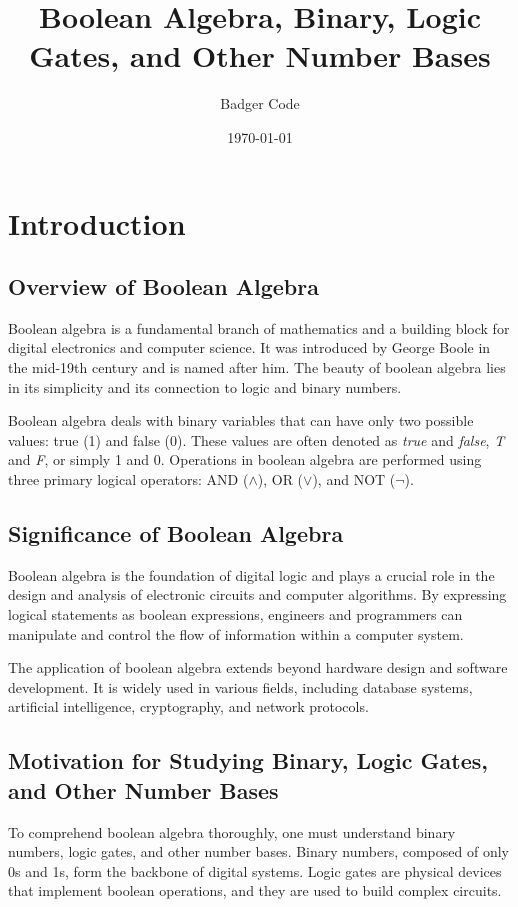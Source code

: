 \documentclass{article}
\title{Boolean Algebra, Binary, Logic Gates, and Other Number Bases}
\author{Badger Code}
\date{\today}
\begin{document}
\maketitle

\section{Introduction}

\subsection{Overview of Boolean Algebra}

Boolean algebra is a fundamental branch of mathematics and a building block for digital electronics and computer science. It was introduced by George Boole in the mid-19th century and is named after him. The beauty of boolean algebra lies in its simplicity and its connection to logic and binary numbers.

Boolean algebra deals with binary variables that can have only two possible values: true (1) and false (0). These values are often denoted as \textit{true} and \textit{false}, \textit{T} and \textit{F}, or simply 1 and 0. Operations in boolean algebra are performed using three primary logical operators: AND ($\land$), OR ($\lor$), and NOT ($\lnot$).

\subsection{Significance of Boolean Algebra}

Boolean algebra is the foundation of digital logic and plays a crucial role in the design and analysis of electronic circuits and computer algorithms. By expressing logical statements as boolean expressions, engineers and programmers can manipulate and control the flow of information within a computer system.

The application of boolean algebra extends beyond hardware design and software development. It is widely used in various fields, including database systems, artificial intelligence, cryptography, and network protocols.

\subsection{Motivation for Studying Binary, Logic Gates, and Other Number Bases}

To comprehend boolean algebra thoroughly, one must understand binary numbers, logic gates, and other number bases. Binary numbers, composed of only 0s and 1s, form the backbone of digital systems. Logic gates are physical devices that implement boolean operations, and they are used to build complex circuits.
\end{document}
